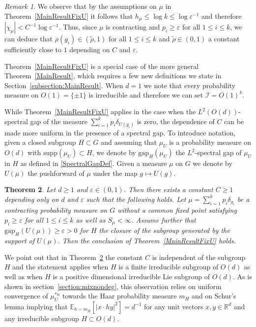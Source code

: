 \documentclass[10pt, english,oneside,reqno]{amsart}
\theoremstyle{plain}
\newtheorem{theorem}{Theorem}[section]
\theoremstyle{remark}
\newtheorem{remark}[theorem]{Remark}
\numberwithin{equation}{section}
\numberwithin{figure}{section}
\newcommand{\eps}{\varepsilon}
\newcommand{\R}{\mathbb{R}}
\newcommand{\E}{\mathbb{E}}
\newcommand{\Haarof}[1]{m_{#1}}
\begin{document}
    \begin{remark}\label{rhoRemark}
    We observe that by the assumptions on $\mu$ in Theorem~\ref{MainResultFixU} it follows that $h_{\mu}\leq \log k \leq \log \eps^{-1}$ and therefore $|\chi_{\mu}| < C^{-1}\log \eps^{-1}$. Thus, since $\mu$ is contracting and $p_i \geq \eps$ for all $1\leq i \leq k$, we can deduce that $\rho(g_i) \in (\tilde{\rho},1)$ for all $1 \leq i \leq k$ and $\tilde{\rho} \in (0,1)$ a constant sufficiently close to $1$ depending on $C$ and $\eps$.
    \end{remark}

    Theorem~\ref{MainResultFixU} is a special case of the more general Theorem~\ref{MainResult}, which requires a few new definitions we state in Section~\ref{subsection:MainResult}. When $d = 1$ we note that every probability measure on $O(1) = \{\pm 1 \}$ is irreducible and therefore we can set $\mathcal{I} = O(1)^k$.
    
    While Theorem~\ref{MainResultFixU} applies in the case when the $L^2(O(d))$-spectral gap of the measure $\sum_{i = 1}^k p_i\delta_{U(g_i)}$ is zero, the dependence of $C$ can be made more uniform in the presence of a spectral gap. To introduce notation, given a closed subgroup $H \subset G$ and assuming that $\mu_U$ is a probability measure on $O(d)$ with $\mathrm{supp}(\mu_U) \subset H$, we denote by $\mathrm{gap}_H(\mu_U)$ the $L^2$-spectral gap of $\mu_U$ in $H$ as defined in \eqref{SpectralGapDef}. Given a measure $\mu$ on $G$ we denote by $U(\mu)$ the pushforward of $\mu$ under the map $g \mapsto U(g)$.

    \begin{theorem}\label{SpectralGapTheorem}
        Let $d\geq 1$ and $\eps \in (0,1)$. Then there exists a constant $C \geq 1$ depending only on $d$ and $\eps$ such that the following holds. Let $\mu = \sum_{i = 1}^k p_i\delta_{g_i}$ be a contracting probability measure on $G$ without a common fixed point satisfying $p_i \geq \eps$ for all $1 \leq i \leq k$ as well as $S_{\mu}<\infty$. Assume further that $\mathrm{gap}_H(U(\mu)) \geq \eps > 0$ for $H$ the closure of the subgroup generated by the support of $U(\mu)$. Then the conclusion of Theorem~\ref{MainResultFixU} holds. 
    \end{theorem}
    
    We point out that in Theorem~\ref{SpectralGapTheorem} the constant $C$ is independent of the subgroup $H$ and the statement applies when $H$ is a finite irreducible subgroup of $O(d)$ as well as when $H$ is a positive dimensional irreducible Lie subgroup of $O(d)$. As is shown in section~\ref{section:mixnondeg}, this observation relies on uniform convergence of $\mu_U^{*n}$ towards the Haar probability measure $\Haarof{H}$ and on Schur's lemma implying that $\E_{h \sim \Haarof{H}}[|x \cdot hy|^2] = d^{-1}$ for any unit vectors $x,y \in \R^d$ and any irreducible subgroup $H\subset O(d)$.
\end{document}
